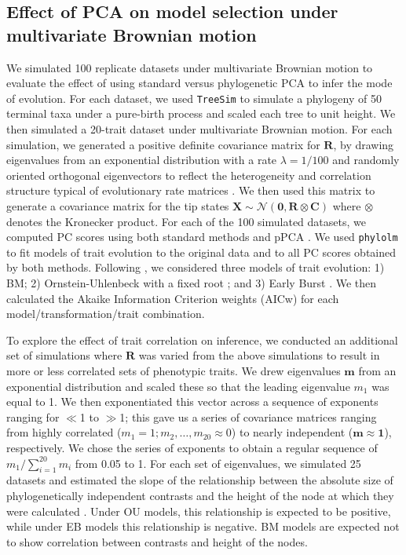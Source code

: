 \documentclass[a4paper,11pt]{article}
\begin{document}
\subsection{Effect of PCA on model selection under multivariate Brownian motion}
We simulated 100 replicate datasets under multivariate Brownian motion to evaluate the effect of using standard versus phylogenetic PCA to infer the mode of evolution. For each dataset, we used \texttt{TreeSim} \citep{treesim} to simulate a phylogeny of 50 terminal taxa under a pure-birth process and scaled each tree to unit height. We then simulated a 20-trait dataset under multivariate Brownian motion. For each simulation, we generated a positive definite covariance matrix for $\mathbf{R}$, by drawing eigenvalues from an exponential distribution with a rate $\lambda = \text{1/100}$ and randomly oriented orthogonal eigenvectors to reflect the heterogeneity and correlation structure typical of evolutionary rate matrices \citep{MezeyandHoule2005, Griswold2007}. We then used this matrix to generate a covariance matrix for the tip states 
$\mathbf{X}\sim \mathcal{N}(\mathbf{0}, \mathbf{R} \otimes \mathbf{C})$ where $\otimes$ denotes the Kronecker product.
For each of the 100 simulated datasets, we computed PC scores using both standard methods and pPCA \citep[using the \texttt{phytools} package;][]{phytools}. We used \texttt{phylolm} \citep{HoandAne2014} to fit models of trait evolution to the original data and to all PC scores obtained by both methods. Following \citet{Harmon2010}, we considered three models of trait evolution: 1) BM; 2) Ornstein-Uhlenbeck with a fixed root \citep[OU:][]{ Hansen1997}; and 3) Early Burst \citep[EB:][]{Blomberg2003, Harmon2010}. We then calculated the Akaike Information Criterion weights (AICw) for each model/transformation/trait combination.

To explore the effect of trait correlation on inference, we conducted an additional set of simulations where $\mathbf{R}$ was varied from the above simulations to result in more or less correlated sets of phenotypic traits. We drew eigenvalues $\mathbf{m}$ from an exponential distribution and scaled these so that the leading eigenvalue $m_{\text{1}}$ was equal to 1. We then exponentiated this vector across a sequence of exponents ranging for $\ll$1 to $\gg$1; this gave us a series of covariance matrices ranging from highly correlated ($m_{\text{1}} = \text{1}; m_{\text{2}}, \ldots, m_{\text{20}} \approx \text{0}$) to nearly independent ($\mathbf{m} \approx \textbf{1}$), respectively. We chose the series of exponents to obtain a regular sequence of $m_{\text{1}} / \sum_{i=\text{1}}^{\text{20}} m_i$ from 0.05 to 1. For each set of eigenvalues, we simulated 25 datasets and estimated the slope of the relationship between the absolute size of phylogenetically independent contrasts \citep{Felsenstein1985} and the height of the node at which they were calculated \citep[the ``node height test'';][]{Purvis1995}. Under OU models, this relationship is expected to be positive, while under EB models this relationship is negative. BM models are expected not to show correlation between contrasts and height of the nodes.
\end{document}
